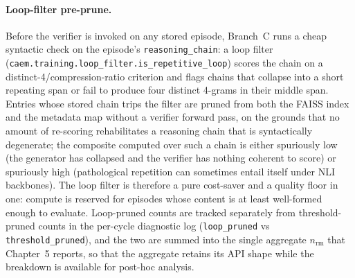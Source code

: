 \paragraph{Loop-filter pre-prune.}
Before the verifier is invoked on any stored episode, Branch~C runs a cheap syntactic check on the episode's \texttt{reasoning\_chain}: a loop filter (\texttt{caem.training.loop\_filter.is\_repetitive\_loop}) scores the chain on a distinct-4/compression-ratio criterion and flags chains that collapse into a short repeating span or fail to produce four distinct 4-grams in their middle span. Entries whose stored chain trips the filter are pruned from both the FAISS index and the metadata map without a verifier forward pass, on the grounds that no amount of re-scoring rehabilitates a reasoning chain that is syntactically degenerate; the composite computed over such a chain is either spuriously low (the generator has collapsed and the verifier has nothing coherent to score) or spuriously high (pathological repetition can sometimes entail itself under NLI backbones). The loop filter is therefore a pure cost-saver and a quality floor in one: compute is reserved for episodes whose content is at least well-formed enough to evaluate. Loop-pruned counts are tracked separately from threshold-pruned counts in the per-cycle diagnostic log (\texttt{loop\_pruned} vs \texttt{threshold\_pruned}), and the two are summed into the single aggregate $n_{\text{rm}}$ that Chapter~5 reports, so that the aggregate retains its API shape while the breakdown is available for post-hoc analysis.

